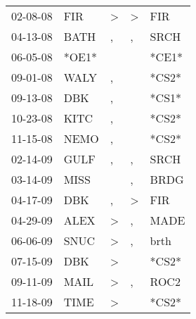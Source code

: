 \begin{supertabular}{p{0.07\textwidth}p{0.06\textwidth}p{0.02\textwidth}p{0.02\textwidth}p{0.06\textwidth}}
 02-08-08\textsuperscript{} &            FIR\textsuperscript{} &     \textgreater &     \textgreater &            FIR\textsuperscript{} \\
 04-13-08\textsuperscript{} &           BATH\textsuperscript{} &                , &                , &           SRCH\textsuperscript{} \\
 06-05-08\textsuperscript{} &                            *OE1* &                  &                  &                            *CE1* \\
 09-01-08\textsuperscript{} &           WALY\textsuperscript{} &                , &                  &                            *CS2* \\
 09-13-08\textsuperscript{} &            DBK\textsuperscript{} &                , &                  &                            *CS1* \\
 10-23-08\textsuperscript{} &           KITC\textsuperscript{} &                , &                  &                            *CS2* \\
 11-15-08\textsuperscript{} &           NEMO\textsuperscript{} &                , &                  &                            *CS2* \\
 02-14-09\textsuperscript{} &           GULF\textsuperscript{} &                , &                , &           SRCH\textsuperscript{} \\
 03-14-09\textsuperscript{} &           MISS\textsuperscript{} &                  &                , &           BRDG\textsuperscript{} \\
 04-17-09\textsuperscript{} &            DBK\textsuperscript{} &                , &     \textgreater &            FIR\textsuperscript{} \\
 04-29-09\textsuperscript{} &           ALEX\textsuperscript{} &     \textgreater &                , &           MADE\textsuperscript{} \\
 06-06-09\textsuperscript{} &           SNUC\textsuperscript{} &     \textgreater &                , &           brth\textsuperscript{} \\
 07-15-09\textsuperscript{} &            DBK\textsuperscript{} &     \textgreater &                  &                            *CS2* \\
 09-11-09\textsuperscript{} &           MAIL\textsuperscript{} &     \textgreater &                , &           ROC2\textsuperscript{} \\
 11-18-09\textsuperscript{} &           TIME\textsuperscript{} &     \textgreater &                  &                            *CS2* \\

\end{supertabular}
